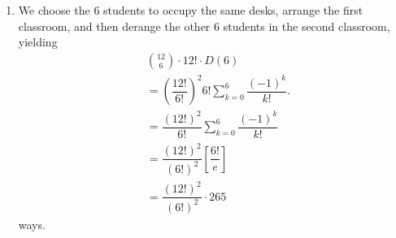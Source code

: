 \documentclass[12pt]{article}
\begin{document}
\begin{enumerate}
\begin{enumerate}
      \item We choose the $6$ students to occupy the same desks,
        arrange the first classroom, and then derange the other $6$
        students in the second classroom, yielding
        \begin{align*}
          &{12 \choose 6} \cdot 12! \cdot D(6) \\
          &= \left(\dfrac{12!}{6!}\right)^2 6! \sum_{k = 0}^6
          \dfrac{(-1)^k}{k!}. \\
          &= \dfrac{(12!)^2}{6!} \sum_{k = 0}^{6} \dfrac{(-1)^k}{k!} \\
          &= \dfrac{(12!)^2}{(6!)^2} \left[\dfrac{6!}{e}\right] \\
          &= \dfrac{(12!)^2}{(6!)^2} \cdot 265
        \end{align*}
        ways.
    \end{enumerate}

\end{enumerate}
\end{document}

